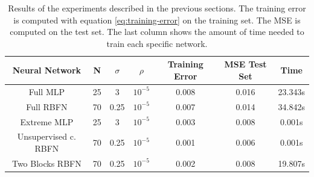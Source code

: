 \documentclass[a4paper]{article}
\numberwithin{equation}{section} %
\numberwithin{figure}{section} %
\numberwithin{table}{section} %
\theoremstyle{definition}
\begin{document}
\begin{table}
	\footnotesize
	\centering
	\begin{tabular}{*{7}{c}}
		Neural Network & N & $\sigma$ & $\rho$ & Training Error & MSE Test Set & Time \\
		\hline
		Full MLP & 25 & 3 & $10^{-5}$ & 0.008 & 0.016 & 23.343s \\
		Full RBFN & 70 & 0.25 & $10^{-5}$ & 0.007 & 0.014 & 34.842s \\
		Extreme MLP & 25 & 3 & $10^{-5}$ & 0.003 & 0.008 & 0.001s \\
		Unsupervised c. RBFN & 70 & 0.25 & $10^{-5}$ & 0.001 & 0.006 & 0.001s \\
		Two Blocks RBFN & 70 & 0.25 & $10^{-5}$ & 0.002 & 0.008 & 19.807s \\
	\end{tabular}
	\caption{Results of the experiments described in the previous sections.
    The training error is computed with equation \ref{eq:training-error} on
    the training set. The MSE is computed on the test set.
		The last column shows the amount of time needed to train each
		specific network.}
	\label{tab:experiments}
\end{table}
\end{document}
